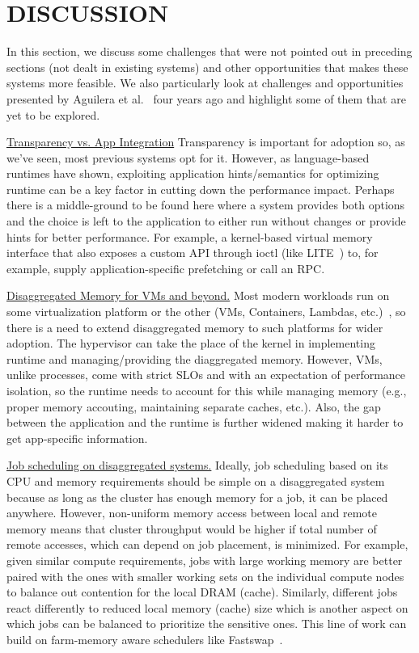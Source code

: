 \section{DISCUSSION}
\label{sec:discussion}
In this section, we discuss some challenges that 
were not pointed out in preceding sections (not dealt 
in existing systems) and other opportunities that makes these 
systems more feasible.
We also particularly look at challenges and opportunities 
presented by Aguilera et al.~\cite{Aguilera2017} four 
years ago and highlight some of them that are yet to be 
explored.


\vspace{3pt}
\noindent \uline{Transparency vs. App Integration}
Transparency is important for adoption so, as we've seen, 
most previous systems opt for it. However, as 
language-based runtimes have shown, exploiting 
application hints/semantics for optimizing runtime can be
a key factor in cutting down the performance impact.
Perhaps there is a middle-ground to be found here 
where a system provides both options and the choice is left
to the application to either run without changes or 
provide hints for better performance. For example, 
a kernel-based virtual memory interface that also exposes 
a custom API through 
ioctl (like LITE~\cite{literdma}) to, for example, supply 
application-specific prefetching or call an RPC.


\vspace{3pt}
\noindent \uline{Disaggregated Memory for VMs and beyond.}
Most modern workloads run on some virtualization platform 
or the other (VMs, Containers, Lambdas, etc.)~\cite{Aguilera2017}, 
so there is a need to extend disaggregated memory to such 
platforms for wider adoption. The hypervisor can take the place 
of the kernel in implementing runtime and managing/providing 
the diaggregated memory. However, VMs, unlike processes, come 
with strict SLOs and with an expectation of performance isolation,
so the runtime needs to account for this while managing memory 
(e.g., proper memory accouting, maintaining separate caches, etc.). 
Also, the gap between the application and the runtime is further 
widened making it harder to get app-specific information.


\vspace{3pt}
\noindent \uline{Job scheduling on disaggregated systems.}
Ideally, job scheduling based on its CPU and memory requirements 
should be simple on a disaggregated system because as long 
as the cluster has enough memory for a job, it can be placed  
anywhere. However, non-uniform memory access between local 
and remote memory means that cluster throughput would be 
higher if total number of remote accesses, which can depend
on job placement, is minimized. For example, given similar 
compute requirements, jobs with large working memory are   
better paired with the ones with smaller working sets on the 
individual compute nodes to balance out contention for the 
local DRAM (cache). Similarly, different jobs react differently 
to reduced local memory (cache) size which is another aspect on 
which jobs can be balanced to prioritize the sensitive ones.
This line of work can build on farm-memory aware schedulers 
like Fastswap~\cite{fastswap}.


